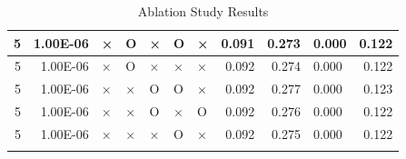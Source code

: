\documentclass[11pt]{article}
\begin{document}
\begin{longtable}[h]{|r|r|l|l|l|l|l|r|r|l|r|}
5                                 & 1.00E-06                         & ×                                & O                                & ×                                & O                                & ×                                 & 0.091                             & 0.273                             & 0.000                              & 0.122                               \\ \hline
5                                 & 1.00E-06                         & ×                                & O                                & ×                                & ×                                & ×                                 & 0.092                             & 0.274                             & 0.000                              & 0.122                               \\ \hline
5                                 & 1.00E-06                         & ×                                & ×                                & O                                & O                                & ×                                 & 0.092                             & 0.277                             & 0.000                              & 0.123                               \\ \hline
5                                 & 1.00E-06                         & ×                                & ×                                & O                                & ×                                & O                                 & 0.092                             & 0.276                             & 0.000                              & 0.122                               \\ \hline
5                                 & 1.00E-06                         & ×                                & ×                                & ×                                & O                                & ×                                 & 0.092                             & 0.275                             & 0.000                              & 0.122                               \\ \hline


\caption{Ablation Study Results}
\label{sec:tab_app_ablation}
\end{longtable}
\end{document}
